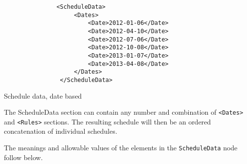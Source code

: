 \begin{listing}[H]
\begin{verbatim}
               <ScheduleData>
                    <Dates>
                        <Date>2012-01-06</Date>
                        <Date>2012-04-10</Date>
                        <Date>2012-07-06</Date>
                        <Date>2012-10-08</Date>
                        <Date>2013-01-07</Date>
                        <Date>2013-04-08</Date>
                    </Dates>
                </ScheduleData>
\end{verbatim}
\caption{Schedule data, date based}
\label{lst:schedule_data_false}
\end{listing}

The ScheduleData section can contain any number and combination of
{\tt <Dates>} and {\tt <Rules>} sections. The resulting schedule will
then be an ordered concatenation of individual schedules.
 
\medskip
The meanings and allowable values of the elements in the \lstinline!ScheduleData! node follow below.


